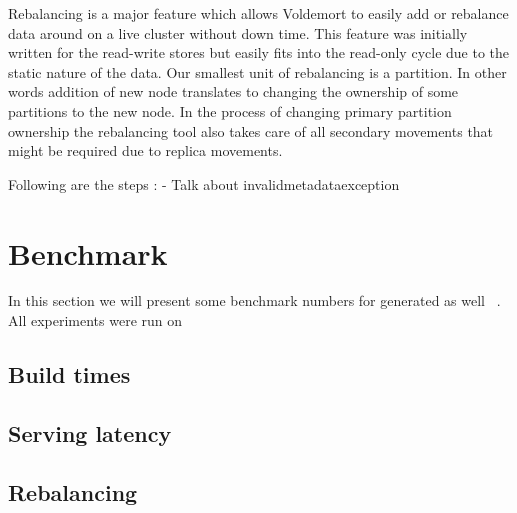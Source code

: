 \documentclass[10pt,twocolumn,preprint,natbib,authoryear]{sigplanconf}
\begin{document}
Rebalancing is a major feature which allows Voldemort to easily add or rebalance data around on a live cluster without down time. This feature was initially written for the read-write stores but easily fits into the read-only cycle due to the static nature of the data. Our smallest unit of rebalancing is a partition. In other words addition of new node translates to changing the ownership of some partitions to the new node. In the process of changing primary partition ownership the rebalancing tool also takes care of all secondary movements that might be required due to replica movements. 



Following are the steps : 
- Talk about invalidmetadataexception



\section{Benchmark}
\label{sec:benchmark}

In this section we will present some benchmark numbers for generated as well  . All experiments were run on 


\subsection{Build times}
\label{sec:benchmark:build_times}



\subsection{Serving latency}
\label{sec:benchmark:serving_latency}



\subsection{Rebalancing}
\label{sec:benchmark:rebalancing}
\end{document}
